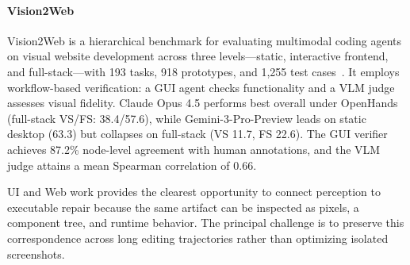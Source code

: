 \paragraph{Vision2Web}
Vision2Web is a hierarchical benchmark for evaluating multimodal coding agents on visual website development across three levels—static, interactive frontend, and full-stack—with 193 tasks, 918 prototypes, and 1,255 test cases~\cite{avg260326648}. It employs workflow-based verification: a GUI agent checks functionality and a VLM judge assesses visual fidelity. Claude Opus 4.5 performs best overall under OpenHands (full-stack VS/FS: 38.4/57.6), while Gemini-3-Pro-Preview leads on static desktop (63.3) but collapses on full-stack (VS 11.7, FS 22.6). The GUI verifier achieves 87.2\% node-level agreement with human annotations, and the VLM judge attains a mean Spearman correlation of 0.66.

UI and Web work provides the clearest opportunity to connect perception to executable repair because the same artifact can be inspected as pixels, a component tree, and runtime behavior. The principal challenge is to preserve this correspondence across long editing trajectories rather than optimizing isolated screenshots.

\FloatBarrier

\Needspace{0.80\textheight}
